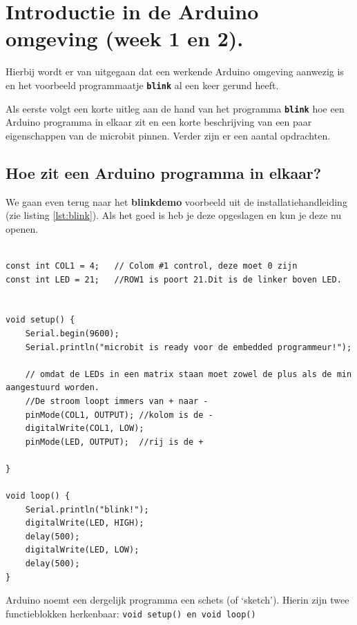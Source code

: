\chapter{Introductie in de Arduino omgeving (week 1 en 2).}
\label{chap:intr}

Hierbij wordt er van uitgegaan dat een werkende Arduino omgeving aanwezig is en het voorbeeld programmaatje \texttt{\textbf{blink}} al een keer gerund heeft.

Als eerste volgt een korte uitleg aan de hand van het programma \texttt{\textbf{blink}} hoe een Arduino programma in elkaar zit en een korte beschrijving van een paar eigenschappen van de microbit pinnen. Verder zijn er een aantal opdrachten.


\section{ Hoe zit een Arduino programma in elkaar?}

We gaan even terug naar het \textbf{blinkdemo} voorbeeld uit de installatiehandleiding (zie listing \ref{lst:blink}).  Als het goed is heb je deze opgeslagen en kun je deze nu openen.

	


\begin{lstlisting}[caption= Het programma blinkdemo,label={lst:blink},firstnumber=15]		
	
const int COL1 = 4;   // Colom #1 control, deze moet 0 zijn
const int LED = 21;   //ROW1 is poort 21.Dit is de linker boven LED.


void setup() {
	Serial.begin(9600);
	Serial.println("microbit is ready voor de embedded programmeur!");
	
	// omdat de LEDs in een matrix staan moet zowel de plus als de min aangestuurd worden.
	//De stroom loopt immers van + naar -
	pinMode(COL1, OUTPUT); //kolom is de -
	digitalWrite(COL1, LOW);
	pinMode(LED, OUTPUT);  //rij is de +
	
}

void loop() {
	Serial.println("blink!");
	digitalWrite(LED, HIGH);
	delay(500);
	digitalWrite(LED, LOW);
	delay(500);
}
\end{lstlisting}

Arduino noemt een dergelijk programma een schets (of ‘sketch’). 
Hierin zijn twee functieblokken herkenbaar: \texttt{{\textcolor{arduinoBlue}{void}} \textcolor{arduinoGreen}{setup}(){} en  \textcolor{arduinoBlue}{void} \textcolor{arduinoGreen}{loop}(){}}

